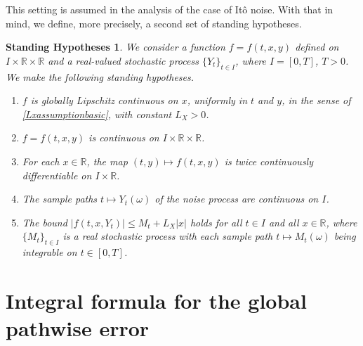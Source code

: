 \documentclass[reqno,12pt]{amsart}
\theoremstyle{plain}%
\newtheorem{stdhyp}{Standing Hypotheses}[section]
\theoremstyle{definition}
\begin{document}
This setting is assumed in the analysis of the case of It\^o noise. With that in mind, we define, more precisely, a second set of standing hypotheses.

\begin{stdhyp}
    \label{standinghypotheses2}
    We consider a function $f=f(t, x, y)$ defined on $I\times \mathbb{R}\times\mathbb{R}$ and a real-valued stochastic process $\{Y_t\}_{t\in I}$, where $I=[0, T]$, $T > 0$. We make the following standing hypotheses.
    \begin{enumerate}
        \item $f$ is globally Lipschitz continuous on $x$, uniformly in $t$ and $y$, in the sense of \eqref{Lxassumptionbasic}, with constant $L_X > 0$.
        \item $f = f(t, x, y)$ is continuous on $I\times \mathbb{R}\times \mathbb{R}$.
        \item For each $x\in \mathbb{R}$, the map $(t, y) \mapsto f(t, x, y)$ is twice continuously differentiable on $I\times \mathbb{R}$.
        \item The sample paths $t\mapsto Y_t(\omega)$ of the noise process are continuous on $I$.
        \item The bound $|f(t, x, Y_t)| \leq M_t + L_X|x|$ holds for all $t\in I$ and all $x\in\mathbb{R}$, where $\{M_t\}_{t\in I}$ is a real stochastic process with each sample path $t\mapsto M_t(\omega)$ being integrable on $t\in [0, T]$.
    \end{enumerate}
\end{stdhyp}

\section{Integral formula for the global pathwise error}
\end{document}

